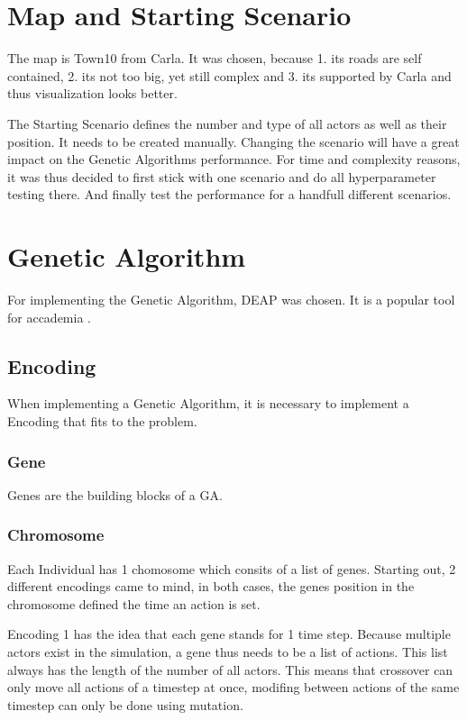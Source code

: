 \section{Map and Starting Scenario}
The map is Town10 from Carla. It was chosen, because 1. its roads are self contained, 2. its not too big, yet still complex and 3. its supported by Carla and thus visualization looks better.

The Starting Scenario defines the number and type of all actors as well as their position. It needs to be created manually.
Changing the scenario will have a great impact on the Genetic Algorithms performance. For time and complexity reasons, it was thus decided to first stick with one scenario and do all hyperparameter testing there. And finally test the performance for a handfull different scenarios.

\section{Genetic Algorithm}
For implementing the Genetic Algorithm, DEAP was chosen. It is a popular tool for accademia .

\subsection{Encoding}
When implementing a Genetic Algorithm, it is necessary to implement a Encoding that fits to the problem.

\subsubsection{Gene}
Genes are the building blocks of a GA.

\subsubsection{Chromosome}
Each Individual has 1 chomosome which consits of a list of genes. Starting out, 2 different encodings came to mind, in both cases, the genes position in the chromosome defined the time an action is set.

Encoding 1 has the idea that each gene stands for 1 time step. Because multiple actors exist in the simulation, a gene thus needs to be a list of actions. This list always has the length of the number of all actors. This means that crossover can only move all actions of a timestep at once, modifing between actions of the same timestep can only be done using mutation.

